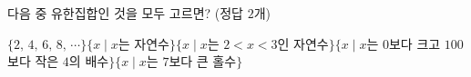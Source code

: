 다음 중 유한집합인 것을 모두 고르면? (정답 $2$개)
\begin{choicesv}{$\{2,\,4,\,6,\,8,\,\cdots\}$}{$\{x \mid x$는 자연수$\}$}{$\{x \mid x$는 $2<x<3$인 자연수$\}$}{$\{x \mid x$는 $0$보다 크고 $100$보다 작은 $4$의 배수$\}$}{$\{x \mid x$는 $7$보다 큰 홀수$\}$}\end{choicesv}
